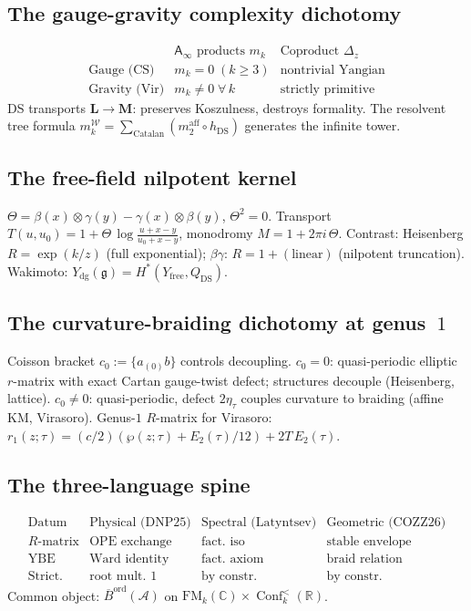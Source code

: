 \documentclass[11pt]{article}
\newcommand{\cA}{\mathcal{A}}
\newcommand{\cW}{\mathcal{W}}
\newcommand{\fg}{\mathfrak{g}}
\newcommand{\barB}{\overline{B}}
\newcommand{\C}{\mathbb{C}}
\newcommand{\R}{\mathbb{R}}
\newcommand{\Ainf}{\mathsf{A}_{\infty}}
\newcommand{\FM}{\mathrm{FM}}
\DeclareMathOperator{\Conf}{Conf}
\begin{document}
\subsection{The gauge-gravity complexity dichotomy}

\[
\begin{array}{c|cc}
& \Ainf\text{ products } m_k & \text{Coproduct } \Delta_z \\
\hline
\text{Gauge (CS)} & m_k = 0 \;(k \ge 3) &
  \text{nontrivial Yangian} \\
\text{Gravity (Vir)} & m_k \neq 0 \;\forall\, k &
  \text{strictly primitive}
\end{array}
\]
DS transports $\mathbf{L} \to \mathbf{M}$: preserves Koszulness,
destroys formality.  The resolvent tree formula
$m_k^{\cW} = \sum_{\text{Catalan}}(m_2^{\mathrm{aff}} \circ h_{\mathrm{DS}})$
generates the infinite tower.


\subsection{The free-field nilpotent kernel}

$\Theta = \beta(x) \otimes \gamma(y) - \gamma(x) \otimes \beta(y)$,
$\Theta^2 = 0$.
Transport $T(u,u_0) = 1 + \Theta\,\log\frac{u+x-y}{u_0+x-y}$,
monodromy $M = 1 + 2\pi i\,\Theta$.
Contrast: Heisenberg $R = \exp(k/z)$ (full exponential);
$\beta\gamma$: $R = 1 + (\text{linear})$ (nilpotent truncation).
Wakimoto: $Y_{\mathrm{dg}}(\fg) = H^*(Y_{\mathrm{free}}, Q_{\mathrm{DS}})$.


\subsection{The curvature-braiding dichotomy at genus~$1$}

Coisson bracket $c_0 := \{a{}_{(0)}b\}$ controls decoupling.
$c_0 = 0$: quasi-periodic elliptic $r$-matrix with exact
Cartan gauge-twist defect; structures decouple (Heisenberg,
lattice).
$c_0 \neq 0$: quasi-periodic, defect $2\eta_\tau$ couples
curvature to braiding (affine KM, Virasoro).
Genus-$1$ $R$-matrix for Virasoro:
$r_1(z;\tau) = (c/2)(\wp(z;\tau) + E_2(\tau)/12) + 2T\,E_2(\tau)$.


\subsection{The three-language spine}

\[
\begin{array}{c|c|c|c}
\text{Datum} & \text{Physical (DNP25)} & \text{Spectral (Latyntsev)}
  & \text{Geometric (COZZ26)} \\
\hline
R\text{-matrix} & \text{OPE exchange} & \text{fact.\ iso} &
  \text{stable envelope} \\
\text{YBE} & \text{Ward identity} & \text{fact.\ axiom} &
  \text{braid relation} \\
\text{Strict.} & \text{root mult.\ $1$} &
  \text{by constr.} & \text{by constr.}
\end{array}
\]
Common object: $\barB^{\mathrm{ord}}(\cA)$ on
$\FM_k(\C) \times \Conf_k^<(\R)$.
\end{document}
